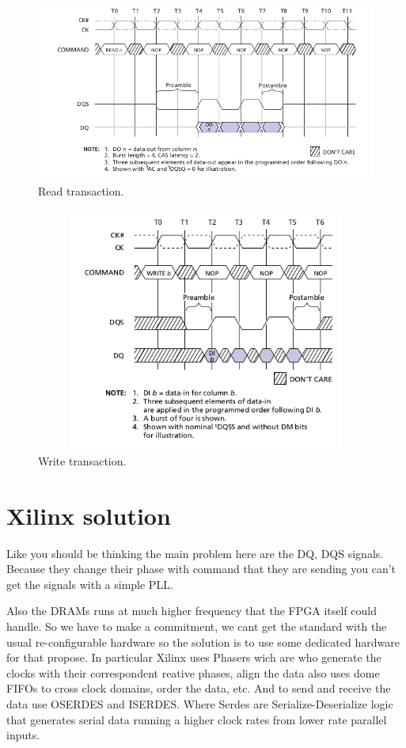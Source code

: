 \begin{figure}
    \centering
    \includegraphics[scale=0.5]{img/read.png}
    \caption{Read transaction.}
    \label{fig:read}
\end{figure}


\begin{figure}
    \centering
    \includegraphics[width=12cm, height=8cm]{img/write.png}
    \caption{Write transaction.}
    \label{fig:write}
\end{figure}



\section{Xilinx solution}

Like you should be thinking the main problem here are the DQ, DQS signals. Because they change their phase with command that they are sending you can't get the signals with a simple PLL.

Also the DRAMs runs at much higher frequency that the FPGA itself could handle. So we have to make a commitment, we cant get the standard with the usual re-configurable hardware so the solution is to use some dedicated hardware for that propose.
In particular Xilinx uses Phasers wich are who generate the clocks with their correspondent reative phases, align the data also uses dome FIFOs to cross clock domains, order the data, etc.
And to send and receive the data use OSERDES and ISERDES. Where Serdes are Serialize-Deserialize logic that generates serial data running a higher clock rates from lower rate parallel inputs.

